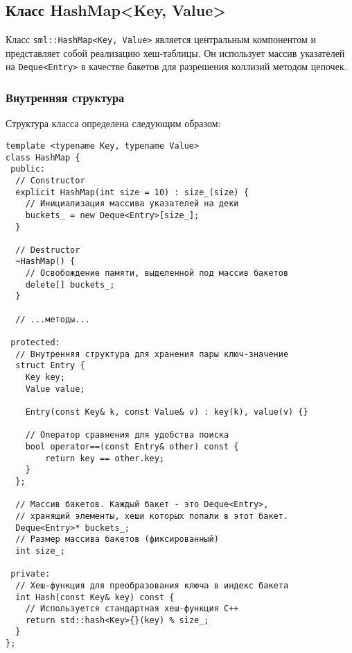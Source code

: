 \documentclass[a4paper,12pt]{article}
\begin{document}
\subsection{Класс HashMap<Key, Value>}

Класс \texttt{sml::HashMap<Key, Value>} является центральным компонентом и представляет собой реализацию хеш-таблицы. Он использует массив указателей на \texttt{Deque<Entry>} в качестве бакетов для разрешения коллизий методом цепочек.

\subsubsection{Внутренняя структура}

Структура класса определена следующим образом:

\begin{lstlisting}[style=cpp]
template <typename Key, typename Value>
class HashMap {
 public:
  // Constructor
  explicit HashMap(int size = 10) : size_(size) {
    // Инициализация массива указателей на деки
    buckets_ = new Deque<Entry>[size_];
  }
  
  // Destructor
  ~HashMap() {
    // Освобождение памяти, выделенной под массив бакетов
    delete[] buckets_;
  }
  
  // ...методы...
  
 protected:
  // Внутренняя структура для хранения пары ключ-значение
  struct Entry {
    Key key;
    Value value;
    
    Entry(const Key& k, const Value& v) : key(k), value(v) {}
    
    // Оператор сравнения для удобства поиска
    bool operator==(const Entry& other) const {
        return key == other.key;
    }
  };
  
  // Массив бакетов. Каждый бакет - это Deque<Entry>, 
  // хранящий элементы, хеши которых попали в этот бакет.
  Deque<Entry>* buckets_;
  // Размер массива бакетов (фиксированный)
  int size_;
  
 private:
  // Хеш-функция для преобразования ключа в индекс бакета
  int Hash(const Key& key) const {
    // Используется стандартная хеш-функция C++
    return std::hash<Key>{}(key) % size_;
  }
};
\end{lstlisting}
\end{document}
